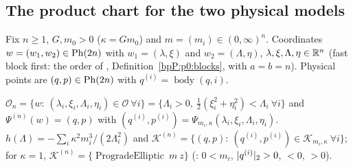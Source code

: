 \subsection{The product chart for the two physical models}\label{bpP:p7:sec-product}

Fix $n\ge1$, $G,m_0>0$ ($\kappa=Gm_0$) and $m=(m_i)\in(0,\infty)^n$. Coordinates $w=(w_1,w_2)\in\mathrm{Ph}(2n)$ with $w_1=(\lambda,\xi)$ and $w_2=(\Lambda,\eta)$, $\lambda,\xi,\Lambda,\eta\in\mathbb{R}^n$ (fast block first: the order of , Definition~\ref{bpP:p0:blocks}, with $a=b=n$). Physical points are $(q,p)\in\mathrm{Ph}(2n)$ with $q^{(i)}=\operatorname{body}(q,i)$.

\begin{definition}\label{bpP:p7:product-def}
$\mathcal O_n=\{w:\ (\lambda_i,\xi_i,\Lambda_i,\eta_i)\in\mathcal O\ \forall i\}=\{\Lambda_i>0,\ \tfrac12(\xi_i^2+\eta_i^2)<\Lambda_i\ \forall i\}$ and $\Psi^{(n)}(w)=(q,p)$ with $(q^{(i)},p^{(i)})=\Psi_{m_i,\kappa}(\lambda_i,\xi_i,\Lambda_i,\eta_i)$. $h(\Lambda)=-\sum_i\kappa^2m_i^3/(2\Lambda_i^2)$ and $\mathcal K^{(n)}=\{(q,p):\ (q^{(i)},p^{(i)})\in\mathcal K_{m_i,\kappa}\ \forall i\}$; for $\kappa=1$, $\mathcal K^{(n)}=\{\operatorname{ProgradeElliptic}\ m\ z\}$ (: $0<m_i$, $\lvert q^{(i)}\rvert_2>0$, ${}<0$, ${}>0$).
\end{definition}

